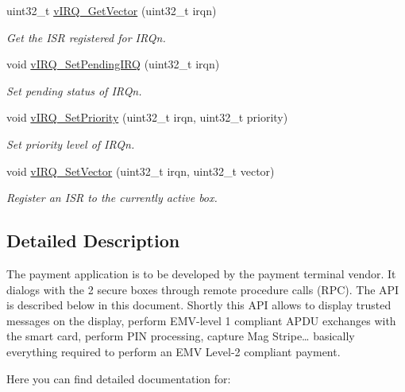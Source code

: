 \begin{DoxyCompactItemize}
uint32\+\_\+t \hyperlink{group__hypervisor_gaaa9c852e90077dd4c553240d769b3658}{v\+I\+R\+Q\+\_\+\+Get\+Vector} (uint32\+\_\+t irqn)
\begin{DoxyCompactList}\small\item\em Get the I\+SR registered for I\+R\+Qn. \end{DoxyCompactList}\item 
void \hyperlink{group__hypervisor_gab5570c2fa5a04a3a183cdef960a43c6b}{v\+I\+R\+Q\+\_\+\+Set\+Pending\+I\+RQ} (uint32\+\_\+t irqn)
\begin{DoxyCompactList}\small\item\em Set pending status of I\+R\+Qn. \end{DoxyCompactList}\item 
void \hyperlink{group__hypervisor_ga3c725e15df2f30fdaed9f1873a7eebdf}{v\+I\+R\+Q\+\_\+\+Set\+Priority} (uint32\+\_\+t irqn, uint32\+\_\+t priority)
\begin{DoxyCompactList}\small\item\em Set priority level of I\+R\+Qn. \end{DoxyCompactList}\item 
void \hyperlink{group__hypervisor_ga3bf7917bc9150d1b91bec5d41962ff13}{v\+I\+R\+Q\+\_\+\+Set\+Vector} (uint32\+\_\+t irqn, uint32\+\_\+t vector)
\begin{DoxyCompactList}\small\item\em Register an I\+SR to the currently active box. \end{DoxyCompactList}\end{DoxyCompactItemize}


\subsection{Detailed Description}
The payment application is to be developed by the payment terminal vendor. It dialogs with the 2 secure boxes through remote procedure calls (R\+PC). The A\+PI is described below in this document. Shortly this A\+PI allows to display trusted messages on the display, perform E\+M\+V-\/level 1 compliant A\+P\+DU exchanges with the smart card, perform P\+IN processing, capture Mag Stripe… basically everything required to perform an E\+MV Level-\/2 compliant payment.

Here you can find detailed documentation for\+:


